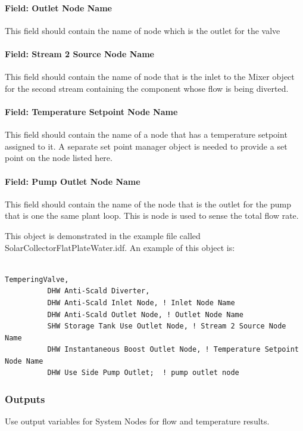 \paragraph{Field: Outlet Node Name}\label{field-outlet-node-name-004}

This field should contain the name of node which is the outlet for the valve

\paragraph{Field: Stream 2 Source Node Name}\label{field-stream-2-source-node-name}

This field should contain the name of node that is the inlet to the Mixer object for the second stream containing the component whose flow is being diverted.

\paragraph{Field: Temperature Setpoint Node Name}\label{field-temperature-setpoint-node-name-000}

This field should contain the name of a node that has a temperature setpoint assigned to it. A separate set point manager object is needed to provide a set point on the node listed here.

\paragraph{Field: Pump Outlet Node Name}\label{field-pump-outlet-node-name}

This field should contain the name of the node that is the outlet for the pump that is one the same plant loop. This is node is used to sense the total flow rate.

This object is demonstrated in the example file called SolarCollectorFlatPlateWater.idf. An example of this object is:

\begin{lstlisting}

TemperingValve,
          DHW Anti-Scald Diverter,
          DHW Anti-Scald Inlet Node, ! Inlet Node Name
          DHW Anti-Scald Outlet Node, ! Outlet Node Name
          SHW Storage Tank Use Outlet Node, ! Stream 2 Source Node Name
          DHW Instantaneous Boost Outlet Node, ! Temperature Setpoint Node Name
          DHW Use Side Pump Outlet;  ! pump outlet node
\end{lstlisting}

\subsubsection{Outputs}\label{outputs-023}

Use output variables for System Nodes for flow and temperature results.